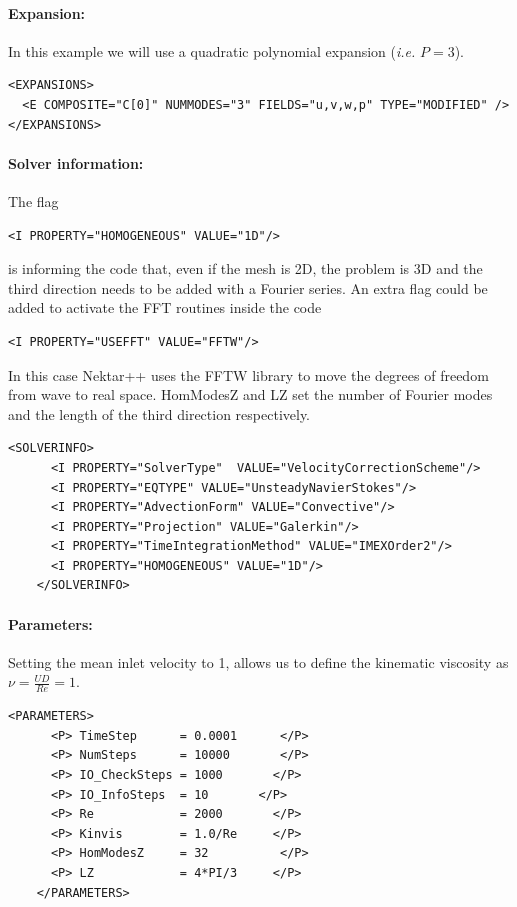 \paragraph{Expansion:~} In this example we will use a quadratic polynomial expansion (\textit{i.e.} $P=3$).
\begin{lstlisting}[style=XMLStyle]
<EXPANSIONS>
  <E COMPOSITE="C[0]" NUMMODES="3" FIELDS="u,v,w,p" TYPE="MODIFIED" />
</EXPANSIONS>
\end{lstlisting}

\paragraph{Solver information:~} The flag 
\begin{lstlisting}[style=XMLStyle]
<I PROPERTY="HOMOGENEOUS" VALUE="1D"/>
\end{lstlisting}
is informing the code that, even if the mesh is 2D, the problem is 3D and the third direction needs to be added with a Fourier series. An extra flag could be added to activate the FFT routines inside the code 
\begin{lstlisting}[style=XMLStyle]
<I PROPERTY="USEFFT" VALUE="FFTW"/>
\end{lstlisting}
In this case Nektar++ uses the FFTW library to move the degrees of freedom from wave to real space. HomModesZ and LZ set the number of Fourier modes and the length of the third direction respectively.

\begin{lstlisting}[style=XMLStyle]
    <SOLVERINFO>
      <I PROPERTY="SolverType"  VALUE="VelocityCorrectionScheme"/>
      <I PROPERTY="EQTYPE" VALUE="UnsteadyNavierStokes"/>
      <I PROPERTY="AdvectionForm" VALUE="Convective"/>
      <I PROPERTY="Projection" VALUE="Galerkin"/>
      <I PROPERTY="TimeIntegrationMethod" VALUE="IMEXOrder2"/>
      <I PROPERTY="HOMOGENEOUS" VALUE="1D"/>
    </SOLVERINFO>
\end{lstlisting}

\paragraph{Parameters:~} Setting the mean inlet velocity to 1, allows us to define the kinematic viscosity as $\nu = \frac{UD}{Re}=1$.
\begin{lstlisting}[style=XMLStyle]
    <PARAMETERS>
      <P> TimeStep      = 0.0001      </P>
      <P> NumSteps      = 10000       </P>
      <P> IO_CheckSteps = 1000       </P>
      <P> IO_InfoSteps  = 10       </P>
      <P> Re            = 2000       </P>
      <P> Kinvis        = 1.0/Re     </P>
      <P> HomModesZ     = 32          </P>
      <P> LZ            = 4*PI/3     </P>
    </PARAMETERS>
\end{lstlisting}

